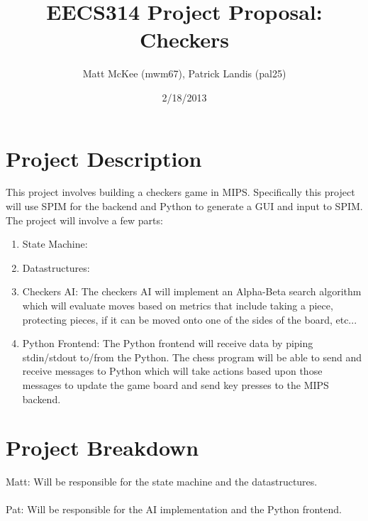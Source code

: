 \documentclass[]{article}
\title{EECS314 Project Proposal: Checkers}
\author{Matt McKee (mwm67), Patrick Landis (pal25)}
\date{2/18/2013}
\begin{document}
\maketitle

\section*{Project Description}
This project involves building a checkers game in MIPS. Specifically this project will use SPIM for the 
backend and Python to generate a GUI and input to SPIM. The project will involve a few parts:

\begin{enumerate}
\item State Machine:

\item Datastructures:

\item Checkers AI: The checkers AI will implement an Alpha-Beta search algorithm which will evaluate
moves based on metrics that include taking a piece, protecting pieces, if it can be moved onto one
of the sides of the board, etc...
 
\item Python Frontend: The Python frontend will receive data by piping stdin/stdout to/from the Python.
The chess program will be able to send and receive messages to Python which will take actions based upon
those messages to update the game board and send key presses to the MIPS backend.
\end{enumerate}

\section*{Project Breakdown}
Matt: Will be responsible for the state machine and the datastructures.\\
\\
Pat: Will be responsible for the AI implementation and the Python frontend.
\end{document}
